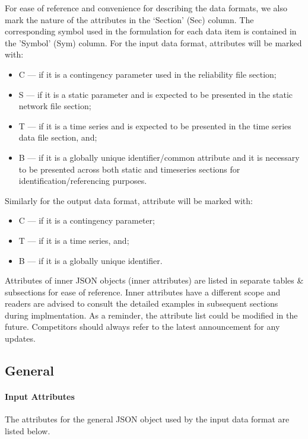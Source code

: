 \documentclass{article}
\begin{document}
For ease of reference and convenience for describing the data formats, we also
mark the nature of the attributes in the `Section' (Sec) column. The corresponding symbol used in the formulation for each data item is contained in the 'Symbol' (Sym) column.
For the input data format, attributes will be marked with:
\begin{itemize}
\item C --- if it is a contingency parameter used in the reliability file section;
\item S --- if it is a static parameter and is expected to be presented in the static network file section;
\item T --- if it is a time series and is expected to be presented in the time series data file section, and;
\item B --- if it is a globally unique identifier/common attribute and it is necessary to be presented across both static and timeseries sections for identification/referencing purposes.  
\end{itemize}
Similarly for the output data format, attribute will be marked with:
\begin{itemize}
\item C --- if it is a contingency parameter;   
\item T --- if it is a time series, and;
\item B --- if it is a globally unique identifier.
\end{itemize}
Attributes of inner JSON objects (inner attributes) are listed in separate tables \& subsections 
for ease of reference.
Inner attributes have a different scope and 
readers are advised to consult the detailed examples in subsequent sections during implmentation.
As a reminder, the attribute list could be modified in the future.
Competitors should always refer to the latest announcement for any
updates.





\subsection{General}
\label{nom:top-level}

\paragraph{Input Attributes}
The attributes for the general JSON object
used by the input data format are listed below.
\end{document}
